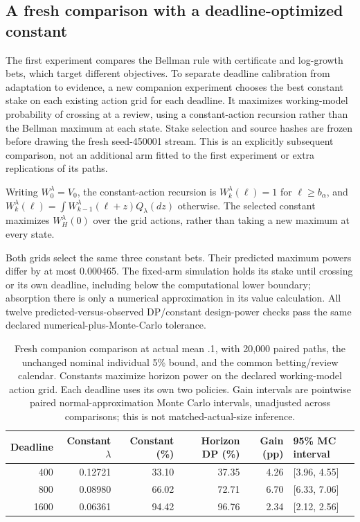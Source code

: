 \subsection{A fresh comparison with a deadline-optimized constant}

The first experiment compares the Bellman rule with certificate and log-growth bets, which target different objectives. To separate deadline calibration from adaptation to evidence, a new companion experiment chooses the best constant stake on each existing action grid for each deadline. It maximizes working-model probability of crossing at a review, using a constant-action recursion rather than the Bellman maximum at each state. Stake selection and source hashes are frozen before drawing the fresh seed-450001 stream. This is an explicitly subsequent comparison, not an additional arm fitted to the first experiment or extra replications of its paths.

Writing $W_0^\lambda=V_0$, the constant-action recursion is $W_k^\lambda(\ell)=1$ for $\ell\ge b_\alpha$, and $W_k^\lambda(\ell)=\int W_{k-1}^\lambda(\ell+z)Q_\lambda(dz)$ otherwise. The selected constant maximizes $W_H^\lambda(0)$ over the grid actions, rather than taking a new maximum at every state.

Both grids select the same three constant bets. Their predicted maximum powers differ by at most 0.000465. The fixed-arm simulation holds its stake until crossing or its own deadline, including below the computational lower boundary; absorption there is only a numerical approximation in its value calculation. All twelve predicted-versus-observed DP/constant design-power checks pass the same declared numerical-plus-Monte-Carlo tolerance.

\begin{table}[H]\centering\small

\begin{tabular}{rrrrrl}\toprule

Deadline & Constant $\lambda$ & Constant (\%) & Horizon DP (\%) & Gain (pp) & 95\% MC interval \\\midrule

400 & 0.12721 & 33.10 & 37.35 & 4.26 & [3.96, 4.55] \\

800 & 0.08980 & 66.02 & 72.71 & 6.70 & [6.33, 7.06] \\

1600 & 0.06361 & 94.42 & 96.76 & 2.34 & [2.12, 2.56] \\

\bottomrule\end{tabular}

\caption{Fresh companion comparison at actual mean .1, with 20,000 paired paths, the unchanged nominal individual 5\% bound, and the common betting/review calendar. Constants maximize horizon power on the declared working-model action grid. Each deadline uses its own two policies. Gain intervals are pointwise paired normal-approximation Monte Carlo intervals, unadjusted across comparisons; this is not matched-actual-size inference.}\label{tab:constant-power}\end{table}


